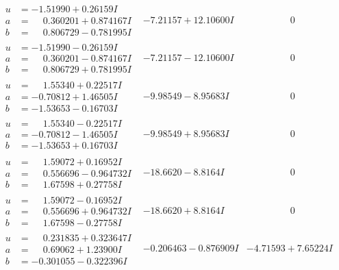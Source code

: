 \documentclass[1p]{elsarticle_modified}
\theoremstyle{definition}
\begin{document}
$$\begin{array}{c|c|c}
\begin{aligned}
u &= -1.51990 + 0.26159 I \\
a &= \phantom{-}0.360201 + 0.874167 I \\
b &= \phantom{-}0.806729 - 0.781995 I\end{aligned}
 & -7.21157 + 12.10600 I & \phantom{-0.000000 } 0 \\ \hline\begin{aligned}
u &= -1.51990 - 0.26159 I \\
a &= \phantom{-}0.360201 - 0.874167 I \\
b &= \phantom{-}0.806729 + 0.781995 I\end{aligned}
 & -7.21157 - 12.10600 I & \phantom{-0.000000 } 0 \\ \hline\begin{aligned}
u &= \phantom{-}1.55340 + 0.22517 I \\
a &= -0.70812 + 1.46505 I \\
b &= -1.53653 - 0.16703 I\end{aligned}
 & -9.98549 - 8.95683 I & \phantom{-0.000000 } 0 \\ \hline\begin{aligned}
u &= \phantom{-}1.55340 - 0.22517 I \\
a &= -0.70812 - 1.46505 I \\
b &= -1.53653 + 0.16703 I\end{aligned}
 & -9.98549 + 8.95683 I & \phantom{-0.000000 } 0 \\ \hline\begin{aligned}
u &= \phantom{-}1.59072 + 0.16952 I \\
a &= \phantom{-}0.556696 - 0.964732 I \\
b &= \phantom{-}1.67598 + 0.27758 I\end{aligned}
 & -18.6620 - 8.8164 I & \phantom{-0.000000 } 0 \\ \hline\begin{aligned}
u &= \phantom{-}1.59072 - 0.16952 I \\
a &= \phantom{-}0.556696 + 0.964732 I \\
b &= \phantom{-}1.67598 - 0.27758 I\end{aligned}
 & -18.6620 + 8.8164 I & \phantom{-0.000000 } 0 \\ \hline\begin{aligned}
u &= \phantom{-}0.231835 + 0.323647 I \\
a &= \phantom{-}0.69062 + 1.23900 I \\
b &= -0.301055 - 0.322396 I\end{aligned}
 & -0.206463 - 0.876909 I & -4.71593 + 7.65224 I \\ \hline\begin{aligned}

\end{aligned}
\end{array}$$
\end{document}
